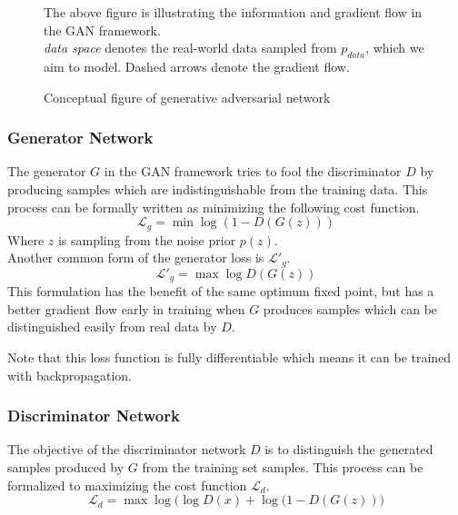 
\begin{figure}[htb]
\centering

  \caption{Conceptual figure of generative adversarial network}
  \label{fig:gan_a}
  \medskip
  \small
  The above figure is illustrating the information and gradient flow in the GAN framework.\\
  \emph{data space} denotes the real-world data sampled from $p_{data}$, which we aim to model.
  Dashed arrows denote the gradient flow.
\end{figure}

%


\subsubsection{Generator Network}
The generator $G$ in the GAN framework tries to fool the discriminator $D$ by producing samples which are indistinguishable from the training data.
This process can be formally written as minimizing the following cost function.
$$
\mathcal{L}_g = \min \log(1 - D(G(z)))
$$
Where $z$ is sampling from the noise prior $p(z)$.\\

Another common form of the generator loss is $\mathcal{L'}_g$.
$$
\mathcal{L'}_g = \max \log D(G(z))
$$
This formulation has the benefit of the same optimum fixed point, but has a better gradient flow early in training when $G$ produces samples which can be distinguished easily from real data by $D$.

Note that this loss function is fully differentiable which means it can be trained with backpropagation.



\subsubsection{Discriminator Network}
The objective of the discriminator network $D$ is to distinguish the generated samples produced by $G$ from the training set samples.
This process can be formalized to maximizing the cost function $\mathcal{L}_d$.
$$
\mathcal{L}_d = \max \log\big(\log D(x) + \log (1 - D(G(z))\big)
$$



